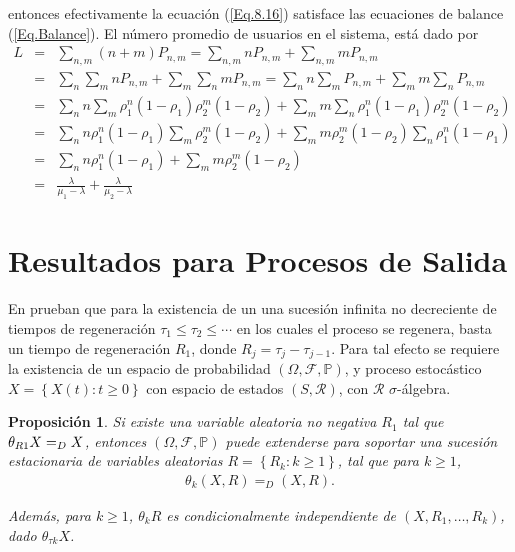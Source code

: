 \documentclass{article}
\newtheorem{Prop}{Proposición}
\newcommand{\prob}{\mathbb{P}}
\begin{document}
entonces efectivamente la ecuaci\'on (\ref{Eq.8.16}) satisface las ecuaciones de balance (\ref{Eq.Balance}). El n\'umero promedio  de usuarios en el sistema, est\'a dado por
\begin{eqnarray*}
L&=&\sum_{n,m}\left(n+m\right)P_{n,m}=\sum_{n,m}nP_{n,m}+\sum_{n,m}mP_{n,m}\\
&=&\sum_{n}\sum_{m}nP_{n,m}+\sum_{m}\sum_{n}mP_{n,m}=\sum_{n}n\sum_{m}P_{n,m}+\sum_{m}m\sum_{n}P_{n,m}\\
&=&\sum_{n}n\sum_{m}\rho_{1}^{n}\left(1-\rho_{1}\right)\rho_{2}^{m}\left(1-\rho_{2}\right)+\sum_{m}m\sum_{n}\rho_{1}^{n}\left(1-\rho_{1}\right)\rho_{2}^{m}\left(1-\rho_{2}\right)\\
&=&\sum_{n}n\rho_{1}^{n}\left(1-\rho_{1}\right)\sum_{m}\rho_{2}^{m}\left(1-\rho_{2}\right)+\sum_{m}m\rho_{2}^{m}\left(1-\rho_{2}\right)\sum_{n}\rho_{1}^{n}\left(1-\rho_{1}\right)\\
&=&\sum_{n}n\rho_{1}^{n}\left(1-\rho_{1}\right)+\sum_{m}m\rho_{2}^{m}\left(1-\rho_{2}\right)\\
&=&\frac{\lambda}{\mu_{1}-\lambda}+\frac{\lambda}{\mu_{2}-\lambda}
\end{eqnarray*}


\section{Resultados para Procesos de Salida}

En \cite{Sigman2} prueban que para la existencia de un una sucesi\'on infinita no decreciente de tiempos de regeneraci\'on $\tau_{1}\leq\tau_{2}\leq\cdots$ en los cuales el proceso se regenera, basta un tiempo de regeneraci\'on $R_{1}$, donde $R_{j}=\tau_{j}-\tau_{j-1}$. Para tal efecto se requiere la existencia de un espacio de probabilidad $\left(\Omega,\mathcal{F},\prob\right)$, y proceso estoc\'astico $\textit{X}=\left\{X\left(t\right):t\geq0\right\}$ con espacio de estados $\left(S,\mathcal{R}\right)$, con $\mathcal{R}$ $\sigma$-\'algebra.

\begin{Prop}
Si existe una variable aleatoria no negativa $R_{1}$ tal que $\theta_{R\footnotesize{1}}X=_{D}X$, entonces $\left(\Omega,\mathcal{F},\prob\right)$ puede extenderse para soportar una sucesi\'on estacionaria de variables aleatorias $R=\left\{R_{k}:k\geq1\right\}$, tal que para $k\geq1$,
\begin{eqnarray*}
\theta_{k}\left(X,R\right)=_{D}\left(X,R\right).
\end{eqnarray*}

Adem\'as, para $k\geq1$, $\theta_{k}R$ es condicionalmente independiente de $\left(X,R_{1},\ldots,R_{k}\right)$, dado $\theta_{\tau k}X$.

\end{Prop}
\end{document}
